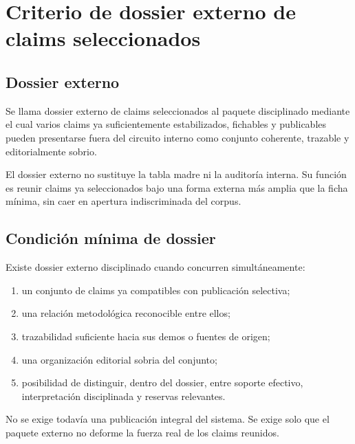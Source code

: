 \chapter{Criterio de dossier externo de claims seleccionados}

\section{Dossier externo}
\begin{definition}
Se llama dossier externo de claims seleccionados al paquete disciplinado mediante el cual varios claims ya suficientemente estabilizados, fichables y publicables pueden presentarse fuera del circuito interno como conjunto coherente, trazable y editorialmente sobrio.
\end{definition}

\begin{observation}
El dossier externo no sustituye la tabla madre ni la auditoría interna. Su función es reunir claims ya seleccionados bajo una forma externa más amplia que la ficha mínima, sin caer en apertura indiscriminada del corpus.
\end{observation}

\section{Condición mínima de dossier}
\begin{definition}
Existe dossier externo disciplinado cuando concurren simultáneamente:
\begin{enumerate}
  \item un conjunto de claims ya compatibles con publicación selectiva;
  \item una relación metodológica reconocible entre ellos;
  \item trazabilidad suficiente hacia sus demos o fuentes de origen;
  \item una organización editorial sobria del conjunto;
  \item posibilidad de distinguir, dentro del dossier, entre soporte efectivo, interpretación disciplinada y reservas relevantes.
\end{enumerate}
\end{definition}

\begin{observation}
No se exige todavía una publicación integral del sistema. Se exige solo que el paquete externo no deforme la fuerza real de los claims reunidos.
\end{observation}

